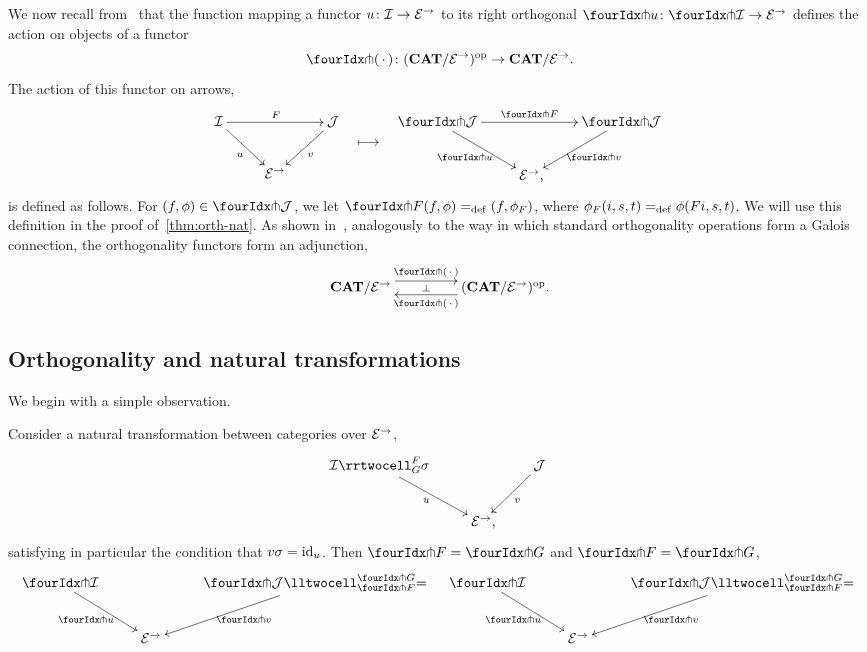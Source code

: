 \documentclass[reqno,10pt,a4paper,oneside,draft]{amsart}
\begin{document}
We now recall from~\cite{garner:small-object-argument} that the function mapping a functor $u \colon \mathcal{I} \to \mathcal{E}^\to$ to its right orthogonal $\liftr{u} \co \liftr{\cal{I}} \to \catE^\to$ defines the action on objects of a functor
\[
  \liftr{\brarghole} \co (\CAT/\catE^\to)^{\op} \to \CAT/\catE^\to \rlap{.}
\]
The action of this functor on arrows,
\begin{align*}
\xymatrix{
  \cal{I} \ar[dr]_u \ar[rr]^F & & \cal{J} \ar[dl]^{v} \\
  & \catE^\to
}
&&
\xymatrix{
  \ar@{}[d]|{\textstyle\longmapsto} \\
  {}
}
&&
\xymatrix{
  \liftr{\cal{J}} \ar[dr]_{\liftr{u}} \ar[rr]^{\liftr{F}} & & \liftr{\cal{J}} \ar[dl]^{\liftr{v}} \\
  & \catE^\to \rlap{,}
}
\end{align*}
is defined as follows.
For $(f, \phi) \in \liftr{\cal{J}}$, we let $\liftr{F}(f,\phi) \defeq (f, \phi_F)$, where $\phi_F(i, s, t) =_{\operatorname{def}} \phi(Fi, s, t)$.
We will use this definition in the proof of~\cref{thm:orth-nat}.
As shown in~\cite[Proposition~3.8]{garner:small-object-argument}, analogously to the way in which standard orthogonality operations form a Galois connection, the orthogonality functors form an adjunction,
\begin{equation} \label{garner-adjunction}
\begin{gathered}
\xymatrix@C+2em{
  \CAT/\catE^\to
  \ar@<5pt>[r]^-{\liftl{\brarghole}}
  \ar@{}[r]|-{\bot}
&
  (\CAT/\catE^\to)^{\op} \rlap{.}
  \ar@<5pt>[l]^-{\liftr{\brarghole}}
}
\end{gathered}
\end{equation}

\subsection*{Orthogonality and natural transformations} We begin with a simple observation.

\begin{proposition} \label{thm:orth-nat}
Consider a natural transformation between categories over $\mathcal{E}^\to$,
\[
\xymatrix{
  \cal{I}
  \rrtwocell_G^F{\sigma}
 \ar[dr]_{u}
&&
  \cal{J}
  \ar[dl]^{v}
\\&
  \catE^\to \rlap{,}
}
\]
satisfying in particular the condition that $v \sigma = \operatorname{id}_u$.
Then $\liftr{F} = \liftr{G}$ and $\liftl{F} = \liftl{G}$,
\begin{align*}
\xymatrix{
  \liftr{\cal{I}}
  \ar[dr]_{\liftr{u}}
&&
  \liftr{\cal{J}}
  \lltwocell_{\liftr{F}}^{\liftr{G}}{=}
  \ar[dl]^{\liftr{v}}
\\&
  \catE^\to
}
&&
\xymatrix{
  \liftl{\cal{I}}
  \ar[dr]_{\liftl{u}}
&&
  \liftl{\cal{J}}
  \lltwocell_{\liftl{F}}^{\liftl{G}}{=}
  \ar[dl]^{\liftl{v}}
\\&
  \catE^\to
}
\end{align*}
\end{proposition}
\end{document}
